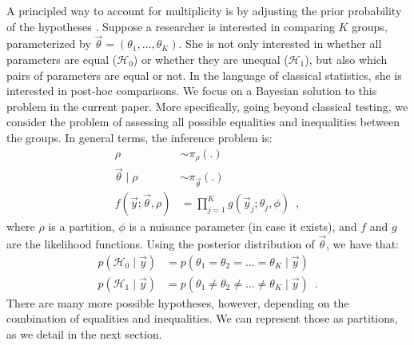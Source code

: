 \documentclass[11pt,a4paper]{article}
\theoremstyle{definition} %
\theoremstyle{case}
\begin{document}
A principled way to account for multiplicity is by adjusting the prior probability of the hypotheses \parencite[e.g.,][]{jeffreys1961theory, westfall1997bayesian}. Suppose a researcher is interested in comparing $K$ groups, parameterized by $\vec{\theta} = (\theta_1, \ldots, \theta_K)$. She is not only interested in whether all parameters are equal ($\mathcal{H}_0$) or whether they are unequal ($\mathcal{H}_1$), but also which pairs of parameters are equal or not. In the language of classical statistics, she is interested in post-hoc comparisons. We focus on a Bayesian solution to this problem in the current paper. More specifically, going beyond classical testing, we consider the problem of assessing all possible equalities and inequalities between the groups. In general terms, the inference problem is:
\begin{align*}
    \rho &\sim \pi_{\rho}(.) \\
    \vec{\theta} \mid \rho &\sim \pi_{\vec{\theta}}(.) \\
    f(\vec{y}; \vec{\theta}, \rho) &= \prod_{j=1}^K g(\vec{y}_{j}; \theta_j, \phi) \enspace ,
\end{align*}
where $\rho$ is a partition, $\phi$ is a nuisance parameter (in case it exists), and $f$ and $g$ are the likelihood functions. Using the posterior distribution of $\vec{\theta}$, we have that:
\begin{align*}
    p(\mathcal{H}_0 \mid \vec{y}) &= p(\theta_1 = \theta_2 = \ldots = \theta_K \mid \vec{y}) \\
    p(\mathcal{H}_1 \mid \vec{y}) &= p(\theta_1 \neq \theta_2 \neq \ldots \neq \theta_K \mid \vec{y}) \enspace .
\end{align*}
There are many more possible hypotheses, however, depending on the combination of equalities and inequalities. We can represent those as partitions, as we detail in the next section. %
\end{document}
